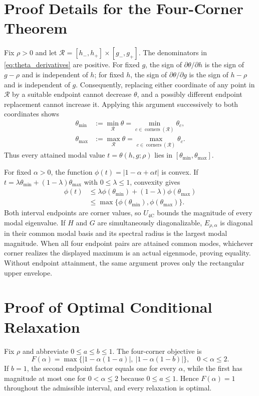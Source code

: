 \documentclass[pdflatex,iicol,sn-mathphys-num]{sn-jnl}
\theoremstyle{definition}
\newcommand{\Ufour}{U_{\mathrm{4C}}}
\begin{document}
\section{Proof Details for the Four-Corner Theorem}\label{app:corner}
Fix $\rho>0$ and let
$\mathcal R=[h_-,h_+]\times[g_-,g_+]$. The denominators in
\eqref{eq:theta_derivatives} are positive. For fixed $g$, the sign of
$\partial\theta/\partial h$ is the sign of $g-\rho$ and is independent of
$h$; for fixed $h$, the sign of $\partial\theta/\partial g$ is the sign of
$h-\rho$ and is independent of $g$. Consequently, replacing either coordinate
of any point in $\mathcal R$ by a suitable endpoint cannot decrease
$\theta$, and a possibly different endpoint replacement cannot increase it.
Applying this argument successively to both coordinates shows
\begin{align}
\theta_{\min}&:=\min_{\mathcal R}\theta
=\min_{c\in\operatorname{corners}(\mathcal R)}\theta_c,\nonumber\\
\theta_{\max}&:=\max_{\mathcal R}\theta
=\max_{c\in\operatorname{corners}(\mathcal R)}\theta_c.
\end{align}
Thus every attained modal value $t=\theta(h,g;\rho)$ lies in
$[\theta_{\min},\theta_{\max}]$.

For fixed $\alpha>0$, the function
$\phi(t)=|1-\alpha+\alpha t|$ is convex. If
$t=\lambda\theta_{\min}+(1-\lambda)\theta_{\max}$ with
$0\le\lambda\le1$, convexity gives
\begin{align}
\phi(t)&\le
\lambda\phi(\theta_{\min})+(1-\lambda)\phi(\theta_{\max})\nonumber\\
&\le\max\{\phi(\theta_{\min}),\phi(\theta_{\max})\}.
\end{align}
Both interval endpoints are corner values, so $\Ufour$ bounds the magnitude
of every modal eigenvalue. If $H$ and $G$ are simultaneously diagonalizable,
$E_{\rho,\alpha}$ is diagonal in their common modal basis and its spectral
radius is the largest modal magnitude. When all four endpoint pairs are
attained common modes, whichever corner realizes the displayed maximum is an
actual eigenmode, proving equality. Without endpoint attainment, the same
argument proves only the rectangular upper envelope.

\section{Proof of Optimal Conditional Relaxation}\label{app:relaxation}
Fix $\rho$ and abbreviate $0\le a\le b\le1$. The four-corner objective is
\begin{equation}
F(\alpha)=
\max\{|1-\alpha(1-a)|,\ |1-\alpha(1-b)|\},
\quad 0<\alpha\le2.
\end{equation}
If $b=1$, the second endpoint factor equals one for every $\alpha$, while the
first has magnitude at most one for $0<\alpha\le2$ because $0\le a\le1$.
Hence $F(\alpha)=1$ throughout the admissible interval, and every relaxation
is optimal.
\end{document}
